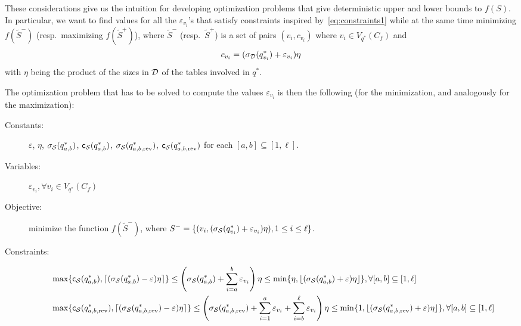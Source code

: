 These considerations give us the intuition for developing optimization
problems that give deterministic upper and lower bounds to $f(S)$.
In particular, we want to find values for all the $\varepsilon_{v_i}$'s that
satisfy constraints inspired by~\eqref{eq:constraints1} while at the same
time minimizing $f(\tilde S^-)$ (resp.~maximizing $f(\tilde S^+)$), where
$\tilde S^-$ (resp.~$\tilde S^+$) is a set of pairs
$(v_i,c_{v_i})$ where $v_i\in V_{q^*}(C_f)$ and 
\[
c_{v_i} = (\sigma_{\cal D}(q^*_{v_i})+\varepsilon_{v_i})\eta
\]
with $\eta$ being the product of the sizes in ${\cal D}$ of the tables involved in
$q^*$.

The optimization problem that has to be solved to compute the values
$\varepsilon_{v_i}$ is then the following (for the minimization, and analogously
for the maximization):
\begin{description}
  \item[Constants:] $\varepsilon$, $\eta$,
    $\sigma_{\cal S}(q^*_{a,b})$, $\mathsf{c}_{\cal S}(q^*_{a,b})$,
    $\sigma_{\cal S}(q^*_{a,b,\mathrm{rev}})$,
    $\mathsf{c}_{\cal S}(q^*_{a,b,\mathrm{rev}})$ for each $[a,b]\subseteq[1,\ell]$.
  \item[Variables:] $\varepsilon_{v_i}, \forall v_i\in V_{q^*}(C_f)$ 
  \item[Objective:] minimize the function $f(\tilde S^-)$, where
    $S^-=\{(v_i,(\sigma_{\cal S}(q^*_{v_i})+\varepsilon_{v_i})\eta), 1\le i\le
    \ell\}$.
  \item[Constraints:]
    \begin{align*}
    &\max\{\mathsf{c}_{\cal S}(q^*_{a,b}),
    \lceil(\sigma_{\cal S}(q^*_{a,b})-\varepsilon)\eta\rceil\} \le
    \left(\sigma_{\cal S}(q^*_{a,b})+\sum_{i=a}^b\varepsilon_{v_i}\right)\eta \le
    \min\{\eta,\lfloor(\sigma_{\cal S}(q^*_{a,b})+\varepsilon)\eta\rfloor\}, \forall
    [a,b]\subseteq[1,\ell] \\
    &\max\{\mathsf{c}_{\cal S}(q^*_{a,b,\mathrm{rev}}),
    \lceil(\sigma_{\cal S}(q^*_{a,b,\mathrm{rev}})-\varepsilon)\eta\rceil\} \le
    \left(\sigma_{\cal S}(q^*_{a,b,\mathrm{rev}})+\sum_{i=1}^a\varepsilon_{v_i}+\sum_{i=b}^\ell\varepsilon_{v_i}\right)\eta \le
    \min\{1,\lfloor(\sigma_{\cal S}(q^*_{a,b,\mathrm{rev}})+\varepsilon)\eta\rfloor\}, \forall [a,b]\subseteq[1,\ell]
    \end{align*}
\end{description}
